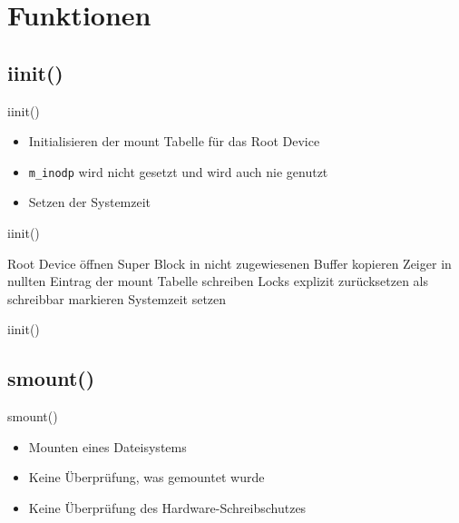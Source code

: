 \documentclass{beamer}
\begin{document}
\section{Funktionen}

\begin{frame}[plain]
    \sectionpage
\end{frame}




\subsection{iinit()}

\begin{frame}{iinit()}
    \begin{itemize}
        \item Initialisieren der mount Tabelle für das Root Device
        \item \texttt{m\_inodp} wird nicht gesetzt und wird auch nie genutzt
        \item Setzen der Systemzeit
    \end{itemize}
\end{frame}

\begin{frame}{iinit()}
    \begin{algorithmic}[1]
        \State Root Device öffnen
        \State Super Block in nicht zugewiesenen Buffer kopieren
        \State Zeiger in nullten Eintrag der mount Tabelle schreiben
        \State Locks explizit zurücksetzen
        \State als schreibbar markieren
        \State Systemzeit setzen
    \end{algorithmic}
\end{frame}

\begin{frame}{iinit()}
\end{frame}




\subsection{smount()}

\begin{frame}{smount()}
    \begin{itemize}
        \item Mounten eines Dateisystems
        \item Keine Überprüfung, was gemountet wurde
        \item Keine Überprüfung des Hardware-Schreibschutzes
    \end{itemize}
\end{frame}
\end{document}
